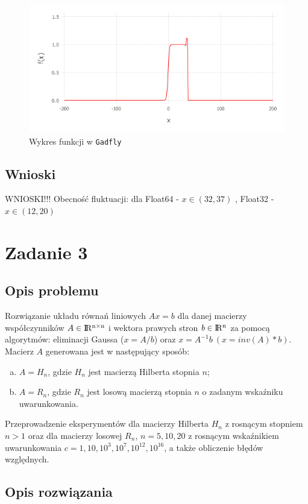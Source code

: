 \documentclass{classrep}
\begin{document}
  		\begin{figure}
  			\includegraphics[scale=0.5, width=\textwidth]{zad2/plotGadfly.png}
			\caption{Wykres funkcji w \texttt{Gadfly}}
			\label{includegraphics:2}
		\end{figure}
	\subsection{Wnioski}
		WNIOSKI!!! Obecność fluktuacji: dla Float64 - $x\in (32, 37)$ , Float32 - $x \in (12,20)$
\section{Zadanie 3}
	\subsection{Opis problemu}
		Rozwiązanie układu równań liniowych $Ax = b$ dla danej macierzy współczynników $A \in {\rm I\!R^{n \times n}}$ i wektora prawych stron $b \in {\rm I\!R^n}$ za pomocą algorytmów: eliminacji Gaussa ($x=A/b$) oraz $x = A^{-1}b ~(x=inv(A)*b)$. 
		Macierz $A$ generowana jest w następujący sposób:
		\begin{enumerate}[(a)]
			\item $A = H_n$, gdzie $H_n$ jest macierzą Hilberta stopnia $n$;
			\item $A = R_n$, gdzie $R_n$ jest losową macierzą stopnia $n$ o zadanym wskaźniku uwarunkowania.
		\end{enumerate}
		Przeprowadzenie eksperymentów dla macierzy Hilberta $H_n$ z rosnącym stopniem $n > 1$ oraz dla macierzy losowej $R_n$, $n = 5, 10, 20$ z rosnącym wskaźnikiem uwarunkowania $c = 1, 10, 10^3, 10^7, 10^{12}, 10^{16}$, a także obliczenie błędów względnych.
	\subsection{Opis rozwiązania}
		
\end{document}
